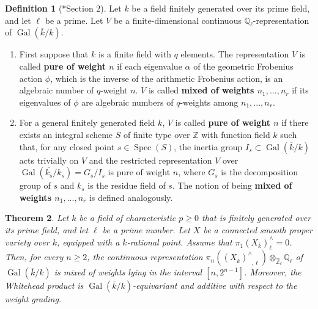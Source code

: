 \documentclass[11pt]{amsart}
\newtheorem{theorem}{Theorem}[section]
\theoremstyle{definition}
\newtheorem{definition}[theorem]{Definition}
\numberwithin{equation}{section}
\numberwithin{equation}{section}
\newcommand\QQ{\mathbb{Q}}
\newcommand\ZZ{\mathbb{Z}}
\DeclareMathOperator{\et}{\acute{e}t}
\DeclareMathOperator{\Gal}{Gal}
\DeclareMathOperator{\Spec}{Spec}
\begin{document}
\begin{definition}[\cite{Jannsen-weights}*{Section 2}]\label{Def: weights of representations of Galois groups}
Let $k$ be a field finitely generated over its prime field, and let $\ell$ be a prime. Let $V$ be a finite-dimensional continuous $\QQ_{\ell}$-representation of $\Gal(\overline{k}/k)$.
\begin{enumerate}[leftmargin=0.25in]
    \item First suppose that $k$ is a finite field with $q$ elements. The representation $V$ is called \textbf{pure of weight $n$} if each eigenvalue $\alpha$ of the geometric Frobenius action $\phi$, which is the inverse of the arithmetic Frobenius action, is an algebraic number of $q$-weight $n$. $V$ is called \textbf{mixed of weights $n_1,...,n_r$} if its eigenvalues of $\phi$ are algebraic numbers of $q$-weights among $n_1,...,n_r$.
    \item For a general finitely generated field $k$, $V$ is called \textbf{pure of weight $n$} if there exists an integral scheme $S$ of finite type over $\ZZ$ with function field $k$ such that, for any closed point $s\in \Spec(S)$, the inertia group $I_s\subset \Gal(\overline{k}/k)$ acts trivially on $V$ and the restricted representation $V$ over $\Gal(\overline{k_s}/k_s)=G_s/I_s$ is pure of weight $n$, where $G_s$ is the decomposition group of $s$ and $k_s$ is the residue field of $s$. The notion of being \textbf{mixed of weights $n_1,...,n_r$} is defined analogously.
\end{enumerate}
\end{definition}

\begin{theorem}\label{Thm: weights on etale homotopy groups}
Let $k$ be a field of characteristic $p\geq 0$ that is finitely generated over its prime field, and let $\ell$ be a prime number. Let $X$ be a connected smooth proper variety over $k$, equipped with a $k$-rational point. Assume that $\pi^{\et}_1(X_{\overline{k}})^{\wedge}_{\ell}=0$. Then, for every $n\geq 2$, the continuous representation $\pi_n((X_{\overline{k}})^{\wedge}_{\et,\ell})\otimes_{\widehat{\ZZ}_{\ell}}\QQ_{\ell}$  of $\Gal(\overline{k}/k)$ is mixed of weights lying in the interval $[n,2^{n-1}]$. Moreover, the Whitehead product is $\Gal(\overline{k}/k)$-equivariant and additive with respect to the weight grading.
\end{theorem}
\end{document}
